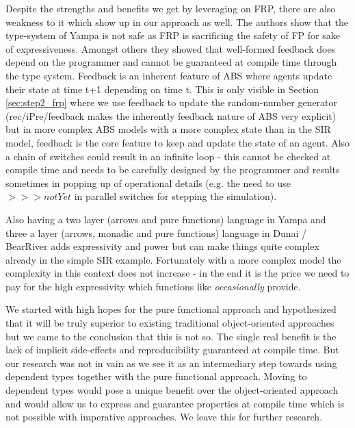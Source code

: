 Despite the strengths and benefits we get by leveraging on FRP, there are also weakness to it which show up in our approach as well. The authors \cite{sculthorpe_safe_2009} show that the type-system of Yampa is not safe as FRP is sacrificing the safety of FP for sake of expressiveness. Amongst others they showed that well-formed feedback does depend on the programmer and cannot be guaranteed at compile time through the type system. Feedback is an inherent feature of ABS where agents update their state at time t+1 depending on time t. This is only visible in Section \ref{sec:step2_frp} where we use feedback to update the random-number generator (rec/iPre/feedback makes the inherently feedback nature of ABS very explicit) but in more complex ABS models with a more complex state than in the SIR model, feedback is the core feature to keep and update the state of an agent. Also a chain of switches could result in an infinite loop - this cannot be checked at compile time and needs to be carefully designed by the programmer and results sometimes in popping up of operational details (e.g. the need to use $>>> notYet$ in parallel switches for stepping the simulation). 

Also having a two layer (arrows and pure functions) language in Yampa \cite{jeffrey_causality_2013} and three a layer (arrows, monadic and pure functions) language in Dunai / BearRiver adds expressivity and power but can make things quite complex already in the simple SIR example. Fortunately with a more complex model the complexity in this context does not increase - in the end it is the price we need to pay for the high expressivity which functions like \textit{occasionally} provide.

We started with high hopes for the pure functional approach and hypothesized that it will be truly superior to existing traditional object-oriented approaches but we came to the conclusion that this is not so. The single real benefit is the lack of implicit side-effects and reproducibility guaranteed at compile time. But our research was not in vain as we see it as an intermediary step towards using dependent types together with the pure functional approach. Moving to dependent types would pose a unique benefit over the object-oriented approach and would allow us to express and guarantee properties at compile time which is not possible with imperative approaches. We leave this for further research.


